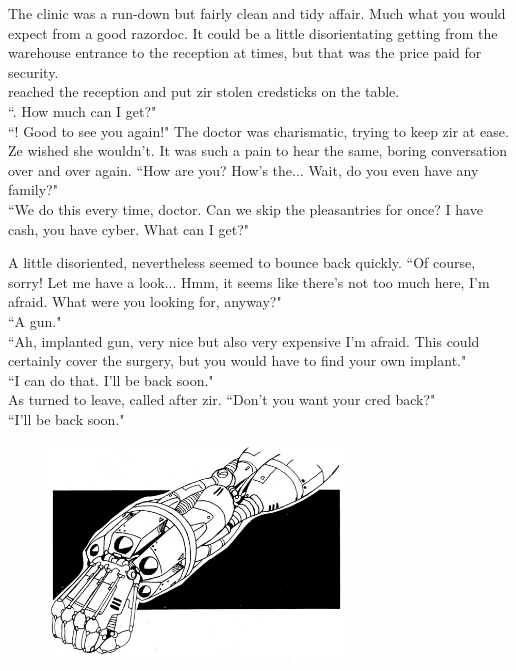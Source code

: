 The clinic was a run-down but fairly clean and tidy affair. Much what you would expect from a good razordoc. It could be a little disorientating getting from the warehouse entrance to the reception at times, but that was the price paid for security.\\
\protagonist{} reached the reception and put zir stolen credsticks on the table.\\
``\razordoc{}. How much can I get?"\\
``\protagonist{}! Good to see you again!" The doctor was charismatic, trying to keep zir at ease. Ze wished she wouldn't. It was such a pain to hear the same, boring conversation over and over again. ``How are you? How's the... Wait, do you even have any family?"\\
``We do this every time, doctor. Can we skip the pleasantries for once? I have cash, you have cyber. What can I get?"

A little disoriented, \razordoc{} nevertheless seemed to bounce back quickly.
``Of course, sorry! Let me have a look... Hmm, it seems like there's not too much here, I'm afraid. What were you looking for, anyway?"\\
``A gun."\\
``Ah, implanted gun, very nice but also very expensive I'm afraid. This could certainly cover the surgery, but you would have to find your own implant."\\
``I can do that. I'll be back soon."\\
As \protagonist{} turned to leave, \razordoc{} called after zir.
``Don't you want your cred back?"\\
``I'll be back soon."

\begin{figure}[h!]
\centering
\includegraphics[width=0.7\textwidth]{./pictures/grebo-guru_arm}
\end{figure}


